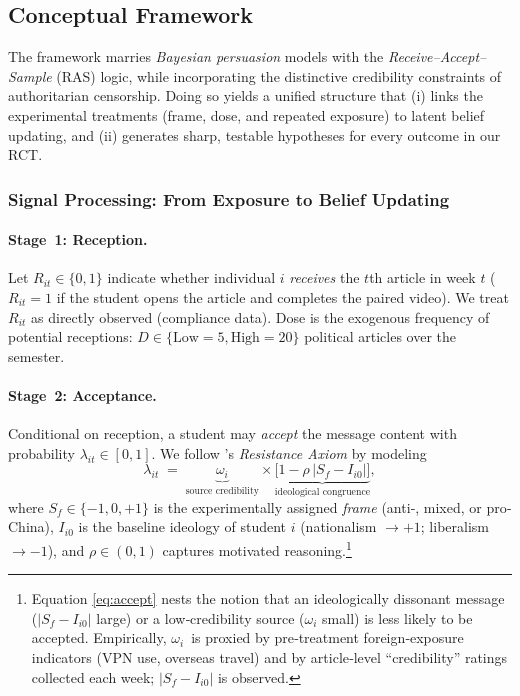 \documentclass[12pt, american]{article}
\begin{document}
\subsection{Conceptual Framework}

The framework marries \emph{Bayesian persuasion} models  with the
\emph{Receive–Accept–Sample} (RAS) logic, while
incorporating the distinctive credibility constraints of authoritarian
censorship.  Doing so yields a unified structure that (i) links the
experimental treatments (frame, dose, and repeated exposure) to latent belief
updating, and (ii) generates sharp, testable hypotheses for every outcome in
our RCT.

\subsubsection{Signal Processing: From Exposure to Belief Updating}

\paragraph{Stage~1: Reception.}
Let $R_{it}\in\{0,1\}$ indicate whether individual $i$ \emph{receives} the
$t$th article in week $t$ ($R_{it}=1$ if the student opens the article and
completes the paired video).  We treat $R_{it}$ as directly observed
(compliance data).  Dose is the exogenous frequency of potential receptions:
$D\in\{\text{Low}=5,\text{High}=20\}$ political articles over the semester.

\paragraph{Stage~2: Acceptance.}
Conditional on reception, a student may \emph{accept} the message content with
probability $\lambda_{it}\in[0,1]$.  We follow 
\citet{zaller1992nature}'s \emph{Resistance Axiom} by modeling
%
\begin{equation}
\lambda_{it} \;=\;
\underbrace{\omega_i}_{\text{source credibility}}
\times
\underbrace{\bigl[1-\rho\,|S_f - I_{i0}|\bigr]}_{\text{ideological congruence}} ,
\label{eq:accept}
\end{equation}
%
where $S_f\in\{-1,0,+1\}$ is the experimentally assigned \emph{frame} (anti‐,
mixed, or pro‐China), $I_{i0}$ is the baseline ideology of student $i$
(nationalism $\rightarrow +1$; liberalism $\rightarrow -1$), and
$\rho\in(0,1)$ captures motivated reasoning.\footnote{Equation
\eqref{eq:accept} nests the notion that an ideologically dissonant
message ($|S_f - I_{i0}|$ large) or a low‐credibility source
($\omega_i$ small) is less likely to be accepted.  Empirically,
$\omega_i$~is proxied by pre‐treatment foreign‐exposure indicators (VPN use,
overseas travel) and by article‐level ``credibility'' ratings collected each
week; $|S_f - I_{i0}|$ is observed.}
\end{document}
